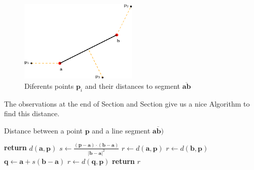 \begin{figure}[htb]
  \centering
  \includegraphics[width=0.50\textwidth]{img/segment2point}
  \caption{Diferents points $\mathbf{p}_i$ and their distances to segment $\overline{\mathbf{a}\mathbf{b}}$}
  \label{fig:seg2point}
\end{figure}

The observations at the end of Section and Section give us a nice Algorithm to find this distance.

{\centering
\begin{minipage}{\linewidth}
  \begin{algorithm}[H]
    \caption{Distance between a point $\mathbf{p}$ and a line segment $\overline{\mathbf{a}\mathbf{b})}$}
    \label{alg:euclid}
    \begin{algorithmic}[1] %
       
         
          \State \textbf{return} $d(\mathbf{a},\mathbf{p})$
        \EndIf
        \State $s \gets \frac{(\mathbf{p} - \mathbf{a}) \cdot (\mathbf{b} - \mathbf{a})}{|\mathbf{b} - \mathbf{a}|^2}$ 
         
          \State $r \gets d(\mathbf{a},\mathbf{p})$
          
          \State $r \gets d(\mathbf{b},\mathbf{p})$
        \Else {}
          \State $\mathbf{q} \gets \mathbf{a} + s (\mathbf{b} - \mathbf{a})$ 
          \State $r \gets d(\mathbf{q},\mathbf{p})$
        \EndIf
        \State \textbf{return} $r$ 
      \EndProcedure
    \end{algorithmic}
  \end{algorithm}
\end{minipage}
\par
}

